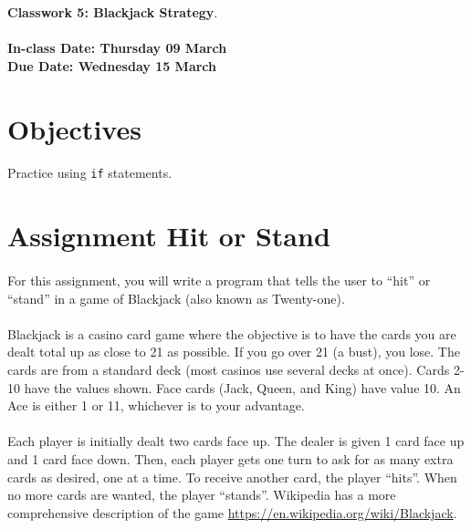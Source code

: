 \documentclass[letter,11pt]{article}
\begin{document}
\huge
\textbf{Classwork 5: Blackjack Strategy}.
\normalsize
\\ ~~ \\
\textbf{In-class Date: Thursday 09 March} \\
\textbf{Due Date: Wednesday 15 March}

\section*{Objectives}
\paragraph{}Practice using \texttt{if} statements.

\section*{Assignment Hit or Stand}
\paragraph{}For this assignment, you will write a program that tells the user to ``hit'' or ``stand'' in a game of Blackjack (also known as Twenty-one).
\paragraph{}Blackjack is a casino card game where the objective is to have the cards you are dealt total up as close to 21 as possible. If you go over 21 (a bust), you lose. The cards are from a standard deck (most casinos use several decks at once). Cards 2-10 have the values shown. Face cards (Jack, Queen, and King) have value 10. An Ace is either 1 or 11, whichever is to your advantage.
\paragraph{}Each player is initially dealt two cards face up. The dealer is given 1 card face up and 1 card face down. Then, each player gets one turn to ask for as many extra cards as desired, one at a time. To receive another card, the player ``hits''. When no more cards are wanted, the player ``stands''. Wikipedia has a more comprehensive description of the game \url{https://en.wikipedia.org/wiki/Blackjack}.
\end{document}
